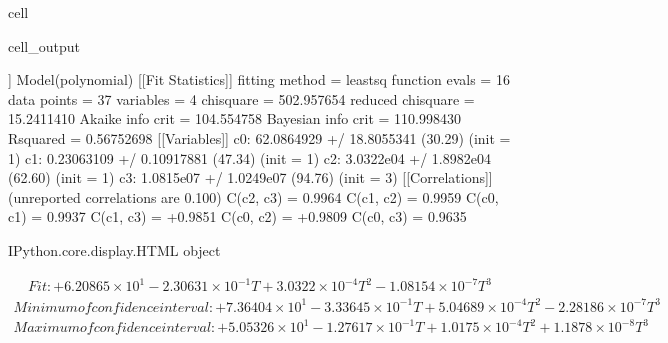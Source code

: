 \documentclass[letterpaper,10pt,english]{jupyterBook}
\begin{document}
\begin{sphinxuseclass}{cell}
\begin{sphinxVerbatimOutput}
\begin{sphinxuseclass}{cell_output}
				\sphinxAtStartPar
				
				\begin{sphinxVerbatim}[commandchars=\\\{\}]
					[[Model]]
					Model(polynomial)
					[[Fit Statistics]]
					\PYGZsh{} fitting method   = leastsq
					\PYGZsh{} function evals   = 16
					\PYGZsh{} data points      = 37
					\PYGZsh{} variables        = 4
					chi\PYGZhy{}square         = 502.957654
					reduced chi\PYGZhy{}square = 15.2411410
					Akaike info crit   = 104.554758
					Bayesian info crit = 110.998430
					R\PYGZhy{}squared          = 0.56752698
					[[Variables]]
					c0:  62.0864929 +/\PYGZhy{} 18.8055341 (30.29\PYGZpc{}) (init = 1)
					c1: \PYGZhy{}0.23063109 +/\PYGZhy{} 0.10917881 (47.34\PYGZpc{}) (init = 1)
					c2:  3.0322e\PYGZhy{}04 +/\PYGZhy{} 1.8982e\PYGZhy{}04 (62.60\PYGZpc{}) (init = 1)
					c3: \PYGZhy{}1.0815e\PYGZhy{}07 +/\PYGZhy{} 1.0249e\PYGZhy{}07 (94.76\PYGZpc{}) (init = 3)
					[[Correlations]] (unreported correlations are \PYGZlt{} 0.100)
					C(c2, c3) = \PYGZhy{}0.9964
					C(c1, c2) = \PYGZhy{}0.9959
					C(c0, c1) = \PYGZhy{}0.9937
					C(c1, c3) = +0.9851
					C(c0, c2) = +0.9809
					C(c0, c3) = \PYGZhy{}0.9635
				\end{sphinxVerbatim}
				
				\begin{sphinxVerbatim}[commandchars=\\\{\}]
					\PYGZlt{}IPython.core.display.HTML object\PYGZgt{}
				\end{sphinxVerbatim}
				
				\sphinxAtStartPar
				\begin{equation*}
					\begin{split}Fit: \boxed{ + 6.20865 \times 10^{1} - 2.30631 \times 10^{-1} T + 3.0322 \times 10^{-4} T^{2} - 1.08154 \times 10^{-7} T^{3}  }\end{split}
				\end{equation*}\begin{equation*}
					\begin{split}Minimum of confidence interval: \boxed{ + 7.36404 \times 10^{1} - 3.33645 \times 10^{-1} T + 5.04689 \times 10^{-4} T^{2} - 2.28186 \times 10^{-7} T^{3}  }\end{split}
				\end{equation*}\begin{equation*}
					\begin{split}Maximum of confidence interval: \boxed{ + 5.05326 \times 10^{1} - 1.27617 \times 10^{-1} T + 1.0175 \times 10^{-4} T^{2} + 1.1878 \times 10^{-8} T^{3}  }\end{split}
				\end{equation*}
				\noindent{}
				
		\end{sphinxuseclass}\end{sphinxVerbatimOutput}
		
	\end{sphinxuseclass}
\end{document}
